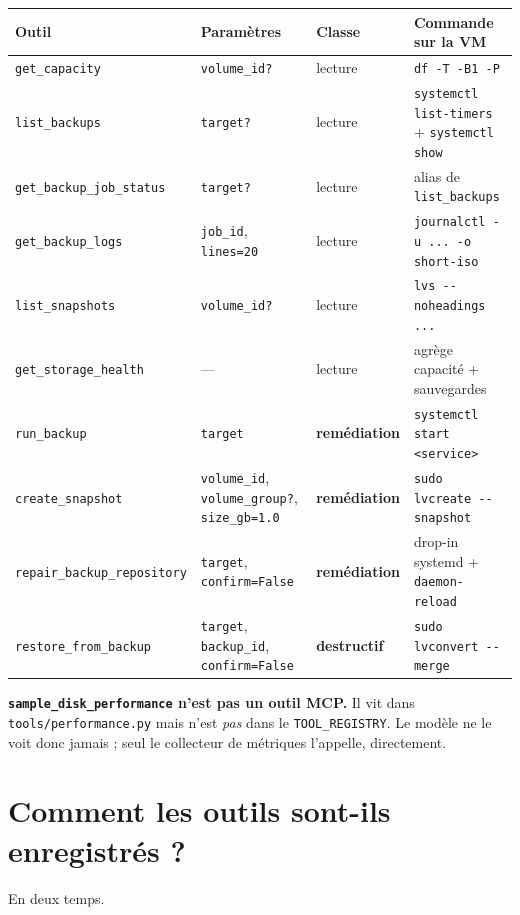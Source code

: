 \documentclass[11pt,a4paper]{report}
\newcommand{\file}[1]{\texttt{\small #1}}
\newcommand{\fn}[1]{\texttt{\small\textcolor{oasisviolet}{#1}}}
\begin{document}
\begin{longtable}{@{}p{4.4cm}p{3.3cm}p{2.0cm}p{4.4cm}@{}}
\toprule
\textbf{Outil} & \textbf{Paramètres} & \textbf{Classe} & \textbf{Commande sur la VM}\\
\midrule
\endhead
\fn{get\_capacity} & \texttt{volume\_id?} & lecture & \texttt{df -T -B1 -P}\\
\fn{list\_backups} & \texttt{target?} & lecture & \texttt{systemctl list-timers} + \texttt{systemctl show}\\
\fn{get\_backup\_job\_status} & \texttt{target?} & lecture & alias de \fn{list\_backups}\\
\fn{get\_backup\_logs} & \texttt{job\_id}, \texttt{lines=20} & lecture & \texttt{journalctl -u ... -o short-iso}\\
\fn{list\_snapshots} & \texttt{volume\_id?} & lecture & \texttt{lvs -{}-noheadings ...}\\
\fn{get\_storage\_health} & --- & lecture & agrège capacité + sauvegardes\\
\fn{run\_backup} & \texttt{target} & \textbf{remédiation} & \texttt{systemctl start <service>}\\
\fn{create\_snapshot} & \texttt{volume\_id}, \texttt{volume\_group?}, \texttt{size\_gb=1.0} & \textbf{remédiation} & \texttt{sudo lvcreate -{}-snapshot}\\
\fn{repair\_backup\_repository} & \texttt{target}, \texttt{confirm=False} & \textbf{remédiation} & drop-in systemd + \texttt{daemon-reload}\\
\fn{restore\_from\_backup} & \texttt{target}, \texttt{backup\_id}, \texttt{confirm=False} & \textbf{destructif} & \texttt{sudo lvconvert -{}-merge}\\
\bottomrule
\end{longtable}

\begin{warnbox}
\textbf{\fn{sample\_disk\_performance} n'est pas un outil MCP.} Il vit dans
\file{tools/performance.py} mais n'est \emph{pas} dans le \fn{TOOL\_REGISTRY}.
Le modèle ne le voit donc jamais ; seul le collecteur de métriques l'appelle,
directement.
\end{warnbox}

\section{Comment les outils sont-ils enregistrés ?}

En deux temps.
\end{document}
